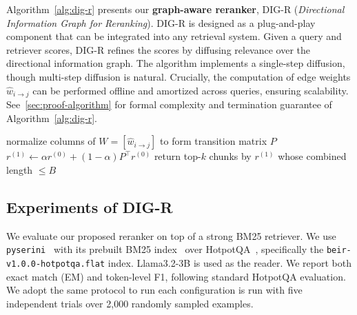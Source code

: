 \documentclass{article} %
\theoremstyle{definition}
\DeclareMathOperator{\NLL}{NLL}
\begin{document}
Algorithm~\ref{alg:dig-r} presents our \textbf{graph-aware reranker}, DIG-R (\emph{Directional Information Graph for Reranking}). DIG-R is designed as a plug-and-play component that can be integrated into any retrieval system. Given a query and retriever scores, DIG-R refines the scores by diffusing relevance over the directional information graph. The algorithm implements a single-step diffusion, though multi-step diffusion is natural. Crucially, the computation of edge weights $\hat{w}_{i\to j}$ can be performed offline and amortized across queries, ensuring scalability. See~\ref{sec:proof-algorithm} for formal complexity and termination guarantee of Algorithm~\ref{alg:dig-r}.

\begin{algorithm}[h]
\caption{DIG-R: Graph-aware Reranking via Directional Information}
\label{alg:dig-r}
\ForEach{$i,j\in\mathcal{N}$}{
  compute $\hat{w}_{i\to j} = \NLL(C_j) - \NLL(C_j\mid C_i)$
}
normalize columns of $W=[\hat{w}_{i\to j}]$ to form transition matrix $P$ \;
$r^{(1)} \leftarrow \alpha r^{(0)} + (1-\alpha) P^\top r^{(0)}$ \;
return top-$k$ chunks by $r^{(1)}$ whose combined length $\le B$ \;
\end{algorithm}

\subsection{Experiments of DIG-R}

We evaluate our proposed reranker on top of a strong BM25 retriever. We use \texttt{pyserini}~\citep{Lin_etal_SIGIR2021_Pyserini} with its prebuilt BM25 index~\citep{Robertson2009BM25} over HotpotQA~\citep{yang2018hotpotqa}, specifically the \texttt{beir-v1.0.0-hotpotqa.flat} index. Llama3.2-3B is used as the reader. We report both exact match (EM) and token-level F1, following standard HotpotQA evaluation. We adopt the same protocol to run each configuration is run with five independent trials over 2{,}000 randomly sampled examples.
\end{document}
